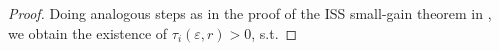 \documentclass[twocolumn]{IEEEtran} %
\theoremstyle{definition}
\newcommand{\Uc}{\mathcal{U}}%
\newcommand{\ep}{\varepsilon}%
\newcommand{\Z}{\mathbb{Z}}%
\begin{document}
\begin{proof}
Doing analogous steps as in the proof of the ISS small-gain theorem in \cite{MKG20}, we obtain the existence of 
$\tau_i(\varepsilon,r)>0$, s.t.
%
%

\end{proof}
\end{document}
